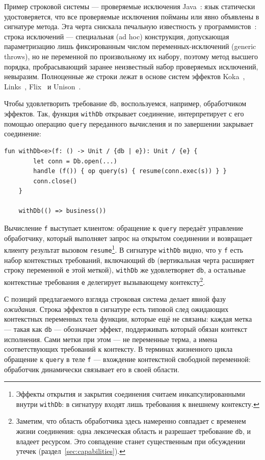 \documentclass{ProcISPRAS}
\begin{document}
Пример строковой системы --- проверяемые исключения Java~\cite{gosling2000java}: язык
статически удостоверяется, что все проверяемые исключения пойманы или явно объявлены в
сигнатуре метода. Эта черта снискала печальную известность у
программистов~\cite{checked-exceptions}: строка исключений --- специальная (ad hoc)
конструкция, допускающая параметризацию лишь фиксированным числом переменных-исключений
(generic throws), но не переменной по произвольному их набору, поэтому метод высшего
порядка, пробрасывающий заранее неизвестный набор проверяемых исключений, невыразим. Полноценные же строки лежат в
основе систем эффектов Koka~\cite{leijen2014koka}, Links~\cite{hillerstrom2016liberating},
Flix~\cite{madsen2020polymorphic} и Unison~\cite{unison-abilities}.

Чтобы удовлетворить требование \lstinline|db|, воспользуемся, например, обработчиком
эффектов. Так, функция \lstinline|withDb| открывает соединение, интерпретирует с его
помощью операцию \lstinline|query| переданного вычисления и по завершении закрывает
соединение:
\begin{lstlisting}[language=colang]
    fun withDb<e>(f: () -> Unit / {db | e}): Unit / {e} {
        let conn = Db.open(...)
        handle (f()) { op query(s) { resume(conn.exec(s)) } }
        conn.close()
    }

    withDb(() => business())
\end{lstlisting}
Вычисление \lstinline|f| выступает клиентом: обращение к \lstinline|query| передаёт
управление обработчику, который выполняет запрос на открытом соединении и возвращает
клиенту результат вызовом
\lstinline|resume|\footnote{Эффекты открытия и закрытия соединения считаем
инкапсулированными внутри \lstinline|withDb|: в сигнатуру входят лишь требования к
внешнему контексту.}. В
сигнатуре \lstinline|withDb| видно, что у \lstinline|f| есть
набор контекстных требований, включающий \lstinline|db| (вертикальная черта расширяет
строку переменной \lstinline|e| этой меткой), \lstinline|withDb| же
удовлетворяет \lstinline|db|, а остальные контекстные требования \lstinline|e|
делегирует вызывающему контексту\footnote{Заметим, что область обработчика здесь
намеренно совпадает с временем жизни соединения: одна лексическая область и разрешает
требование \lstinline|db|, и владеет ресурсом. Это совпадение станет существенным при
обсуждении утечек (раздел~\ref{sec:capabilities}).}.

С позиций предлагаемого взгляда строковая система делает явной фазу \emph{ожидания}.
Строка эффектов в сигнатуре есть типовой след ожидающих контекстных переменных тела функции,
которые ещё не связаны: каждая метка --- такая как \texttt{db} ---
обозначает эффект, поддерживать который обязан контекст исполнения. Сами метки при
этом --- не переменные терма, а имена соответствующих требований к контексту.
В терминах жизненного цикла обращение к \lstinline|query| в теле
\lstinline|f| --- вхождение контекстной свободной переменной: обработчик динамически
связывает его в своей области.
\end{document}
